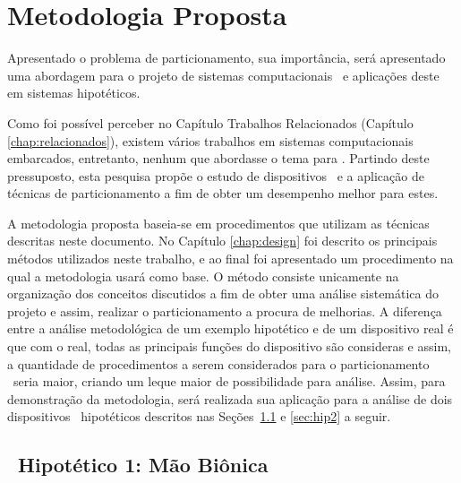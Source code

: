 
\chapter{Metodologia Proposta} \label{chap:met2}
   Apresentado o problema de particionamento, sua importância, será apresentado uma abordagem para o projeto de sistemas computacionais \wearables\ e aplicações deste em sistemas hipotéticos.

   Como foi possível perceber no Capítulo Trabalhos Relacionados (Capítulo \ref{chap:relacionados}), existem vários trabalhos em sistemas computacionais embarcados, entretanto, nenhum que abordasse o tema para \wearables.
   Partindo deste pressuposto, esta pesquisa propõe o estudo de dispositivos \wearables\ e a aplicação de técnicas de particionamento a fim de obter um desempenho melhor para estes.


   A metodologia proposta baseia-se em procedimentos que utilizam as técnicas descritas neste documento.
   No Capítulo \ref{chap:design} foi descrito os principais métodos utilizados neste trabalho, e ao final foi apresentado um procedimento na qual a metodologia usará como base.
   O método consiste unicamente na organização dos conceitos discutidos a fim de obter uma análise sistemática do projeto e assim, realizar o particionamento a procura de melhorias.
   A diferença entre a análise metodológica de um exemplo hipotético e de um dispositivo real é que com o real, todas as principais funções do dispositivo são consideras e assim, a quantidade de procedimentos a serem considerados para o particionamento \hs\ seria maior, criando um leque maior de possibilidade para análise.
   Assim, para demonstração da metodologia, será realizada sua aplicação para a análise de dois dispositivos \wearables\ hipotéticos descritos nas Seções~\ref{sec:hip1} e \ref{sec:hip2} a seguir.


   \section{\Wearable\ Hipotético 1: Mão Biônica} \label{sec:hip1}

